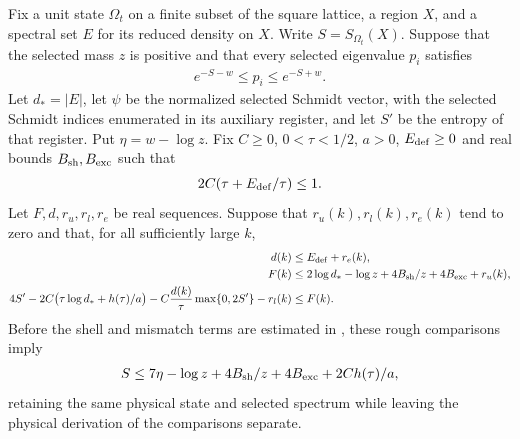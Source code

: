 \begin{lemma}
    \label{thm:area_law_rough_typical_entropy_absorption}
    \leanok
    Fix a unit state $\Omega_t$ on a finite subset of the square lattice,
    a region $X$, and a spectral set $E$ for its reduced density on $X$.
    Write $S=S_{\Omega_t}(X)$. Suppose that the selected mass $z$ is
    positive and that every selected eigenvalue $p_i$ satisfies
    \begin{align}
        e^{-S-w}\le p_i\le e^{-S+w}.
    \end{align}
    Let $d_*=|E|$, let $\psi$ be the normalized selected Schmidt vector,
    with the selected Schmidt indices enumerated in its auxiliary register,
    and let $S'$ be the
    entropy of that register. Put $\eta=w-\log z$.
    Fix $C\ge0$, $0<\tau<1/2$, $a>0$, $E_{\rm def}\ge0$ and real
    bounds $B_{\rm sh},B_{\rm exc}$ such that
    \begin{align}
        2C(\tau+E_{\rm def}/\tau)\le1.
    \end{align}
    Let $F,d,r_u,r_l,r_e$ be real sequences. Suppose that
    $r_u(k),r_l(k),r_e(k)$ tend to zero and that, for all sufficiently
    large $k$,
    \begin{align}
        d(k)                                    & \le E_{\rm def}+r_e(k),                                \\
        F(k)                                    & \le2\log d_*-\log z+4B_{\rm sh}/z+4B_{\rm exc}+r_u(k), \\
        4S'-2C\bigl(\tau\log d_*+h(\tau)/a\bigr)
        -C\frac{d(k)}{\tau}\max\{0,2S'\}-r_l(k) & \le F(k).
    \end{align}
    Before the shell and mismatch terms are estimated in
    \cite[Proposition~9.5]{OpenAI2026AreaLaw}, these rough comparisons
    imply
    \begin{align}
        S\le7\eta-\log z+4B_{\rm sh}/z+4B_{\rm exc}+2Ch(\tau)/a,
    \end{align}
    retaining the same physical state and selected spectrum while leaving
    the physical derivation of the comparisons separate.
\end{lemma}
